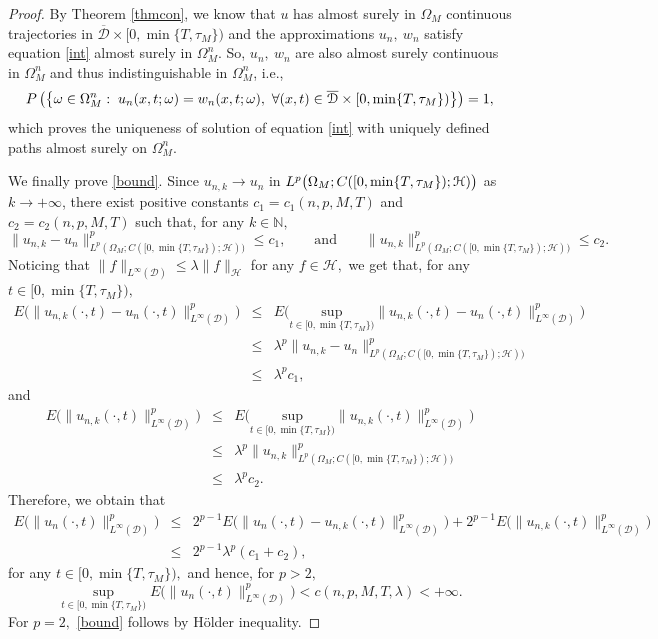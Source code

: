 \documentclass[reqno]{amsart}
\numberwithin{equation}{section}
\newcommand{\Om}{\Omega}
\newcommand{\om}{\omega}
\newcommand{\cd}{\mathcal{D}}
\newcommand{\ocd}{\overline{\mathcal{D}}}
\newcommand{\ch}{\mathcal{H}}
\begin{document}
\begin{proof}
By Theorem \ref{thmcon}, we know that $u$ has almost surely in
$\Omega_M$ continuous trajectories in $\ocd\times[0,\min\{T,\tau_M\})$ and the approximations $u_n,\ w_n$ satisfy equation \eqref{int} almost surely in $\Om_M^{n}$.
So, $u_n,\ w_n$ are also almost surely continuous in
$\Om_M^n$ and thus indistinguishable in $\Om_M^n$, i.e.,
$$P\left(\big{\{}\om\in \Om_M^n:\; u_n(x,t;\om)=w_n(x,t;\om),\ \forall (x,t)\in\ocd\times[0,\min\{T,\tau_M\})\big{\}}\right)=1,$$
which proves the uniqueness of solution of equation \eqref{int} with uniquely defined paths almost surely on $\Om_M^n$.

We finally prove \eqref{bound}. Since $u_{n,k}\rightarrow u_n$ in $L^p\bigl{(}\Om_M;C([0,\min\{T,\tau_M\});\ch)\bigr{)}$ as $k\rightarrow+\infty$, there exist positive constants $ c_1=c_1(n,p,M,T) $ and $ c_2=c_2(n,p,M,T) $ such that, for any $k\in\mathbb N,$
$$\|u_{n,k}-u_n\|^p_{L^p(\Om_M;C([0,\min\{T,\tau_M\});\ch))}\leq c_1 ,
\qquad \text{and} \qquad \|u_{n,k}\|^p_{L^p(\Om_M;C([0,\min\{T,\tau_M\});\ch))}\leq c_2.$$
Noticing that $ \|f\|_{L^{\infty}(\cd)} \leq \lambda \|f\|_{\ch} $ for any $f\in\ch, $ we get that, for any $t\in[0,\min\{T,\tau_M\}),$
\begin{eqnarray*}
E\big(\|u_{n,k}(\cdot,t)-u_n (\cdot,t)\|^p_{L^{\infty}(\cd)}\big)
&\leq& E\big(\underset{t\in[0,\min\{T,\tau_M\})}
{\text{sup}}\|u_{n,k}(\cdot,t)-u_n (\cdot,t)\|^p_{L^{\infty}(\cd)}\big)
\\
&\leq &\lambda^p \|u_{n,k}-u_n\|^p_{L^p(\Om_M;C([0,\min\{T,\tau_M\});\ch))}
\\[0.2cm]
&\leq &\lambda^p c_1,
\end{eqnarray*}
and 
\begin{eqnarray}
E\big(\|u_{n,k}(\cdot,t)\|^p_{L^{\infty}(\cd)}\big)
&\leq&
 E\big(\underset{t\in[0,\min\{T,\tau_M\})}
{\text{sup}}\|u_{n,k}(\cdot,t)\|^p_{L^{\infty}(\cd)}\big)
\nonumber
\\
&\leq& \lambda^p \|u_{n,k}\|^p_{L^p(\Om_M;C([0,\min\{T,\tau_M\});\ch))} 
\nonumber
\\
&\leq& \lambda^p c_2.\label{kwstas2}
\end{eqnarray}
Therefore, we obtain that
\begin{eqnarray*}
E\big(\|u_n(\cdot,t)\|^p_{L^{\infty}(\cd)}\big) 
&\leq& 2^{p-1} E\big(\|u_n(\cdot,t)-u_{n,k}(\cdot,t)\|^p_{L^{\infty}(\cd)}\big)
+
2^{p-1} E\big(\|u_{n,k}(\cdot,t)\|^p_{L^{\infty}(\cd)}\big)
\\[0.2cm]
&\leq &  2^{p-1} \lambda^p (c_1+c_2) ,
\end{eqnarray*}
for any $t\in[0,\min\{T,\tau_M\}), $ and hence, for $p>2,$
$$\sup_{t\in[0,\min\{T,\tau_M\})}E\big(\|u_n(\cdot,t)\|^p_{L^{\infty}(\cd)}\big)<c(n,p,M,T,\lambda) <+\infty.$$
For $ p=2, $ \eqref{bound} follows by H\"older inequality.
\end{proof}
\end{document}
